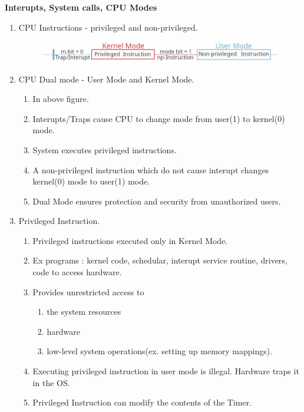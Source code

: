 
\centerline{\textbf{ \LARGE Interupts, System calls, CPU Modes}}




  \begin{enumerate}

  \item CPU Instructions - privileged and non-privileged.
  \begin{figure}[h]
      \centering   \includegraphics[scale=2.5]{./images/cpu_mode_03.jpeg}
  \end{figure}
  \item CPU Dual mode - User Mode and Kernel Mode.
  \begin{enumerate}
        \item In above figure.
        \item Interupts/Traps cause CPU to change mode from user(1) to kernel(0) mode.
        \item System executes privileged instructions.
        \item A non-privileged instruction which do not cause interupt changes kernel(0) mode to user(1) mode.
        \item Dual Mode ensures protection and security from unauthorized users.
  \end{enumerate}


  \item Privileged Instruction.
  \begin{enumerate}
        \item Privileged instructions executed only in Kernel Mode.
        \item Ex programs : kernel code, schedular, interupt service routine, drivers, code to access hardware.
        \item Provides unrestricted access to
         \begin{enumerate}
            \item the system resources
            \item hardware
            \item low-level system operations(ex. setting up memory mappings).
          \end{enumerate}
        \item Executing privileged instruction in user mode is illegal. Hardware traps it in the OS.
        \item Privileged Instruction can modify the contents of the Timer.
  \end{enumerate}


\end{enumerate}
